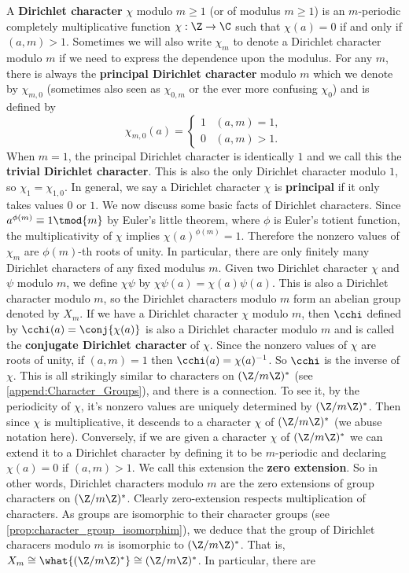       A \textbf{Dirichlet character} $\chi$ modulo $m \ge 1$ (or of modulus $m \ge 1$) is an $m$-periodic completely multiplicative function $\chi:\Z \to \C$ such that $\chi(a) = 0$ if and only if $(a,m) > 1$. Sometimes we will also write $\chi_{m}$ to denote a Dirichlet character modulo $m$ if we need to express the dependence upon the modulus. For any $m$, there is always the \textbf{principal Dirichlet character} modulo $m$ which we denote by $\chi_{m,0}$ (sometimes also seen as $\chi_{0,m}$ or the ever more confusing $\chi_{0}$) and is defined by
      \[
        \chi_{m,0}(a) = \begin{cases} 1 & (a,m) = 1, \\ 0 & (a,m) > 1. \end{cases}
      \]
      When $m = 1$, the principal Dirichlet character is identically $1$ and we call this the \textbf{trivial Dirichlet character}. This is also the only Dirichlet character modulo $1$, so $\chi_{1} = \chi_{1,0}$. In general, we say a Dirichlet character $\chi$ is \textbf{principal} if it only takes values $0$ or $1$. We now discuss some basic facts of Dirichlet characters. Since $a^{\phi(m)} \equiv 1 \tmod{m}$  by Euler's little theorem, where $\phi$ is Euler's totient function, the multiplicativity of $\chi$ implies $\chi(a)^{\phi(m)} = 1$. Therefore the nonzero values of $\chi_{m}$ are $\phi(m)$-th roots of unity. In particular, there are only finitely many Dirichlet characters of any fixed modulus $m$. Given two Dirichlet character $\chi$ and $\psi$ modulo $m$, we define $\chi\psi$ by $\chi\psi(a) = \chi(a)\psi(a)$. This is also a Dirichlet character modulo $m$, so the Dirichlet characters modulo $m$ form an abelian group denoted by $X_{m}$. If we have a Dirichlet character $\chi$ modulo $m$, then $\cchi$ defined by $\cchi(a) = \conj{\chi(a)}$ is also a Dirichlet character modulo $m$ and is called the \textbf{conjugate Dirichlet character} of $\chi$. Since the nonzero values of $\chi$ are roots of unity, if $(a,m) = 1$ then $\cchi(a) = \chi(a)^{-1}$. So $\cchi$ is the inverse of $\chi$. This is all strikingly similar to characters on $(\Z/m\Z)^{\ast}$ (see \cref{append:Character_Groups}), and there is a connection. To see it, by the periodicity of $\chi$, it's nonzero values are uniquely determined by $(\Z/m\Z)^{\ast}$. Then since $\chi$ is multiplicative, it descends to a character $\chi$ of $(\Z/m\Z)^{\ast}$ (we abuse notation here). Conversely, if we are given a character $\chi$ of $(\Z/m\Z)^{\ast}$ we can extend it to a Dirichlet character by defining it to be $m$-periodic and declaring $\chi(a) = 0$ if $(a,m) > 1$. We call this extension the \textbf{zero extension}. So in other words, Dirichlet characters modulo $m$ are the zero extensions of group characters on $(\Z/m\Z)^{\ast}$. Clearly zero-extension respects multiplication of characters. As groups are isomorphic to their character groups (see \cref{prop:character_group_isomorphim}), we deduce that the group of Dirichlet characers modulo $m$ is isomorphic to $(\Z/m\Z)^{\ast}$. That is, $X_{m} \cong \what{(\Z/m\Z)^{\ast}} \cong (\Z/m\Z)^{\ast}$. In particular, there are 
